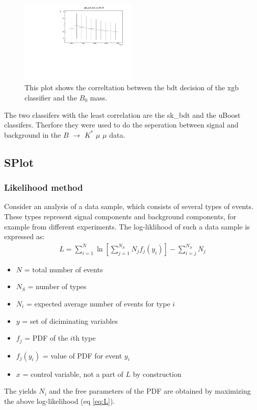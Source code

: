 \documentclass[english]{uzhpub}
\begin{document}
\begin{figure}[H]
  \centering
  \includegraphics[width=0.5\textwidth]{plots/xgb_plot_bdt_vs_B0_M}
  \caption{This plot shows the correltation between the bdt decision of the xgb classifier and the $B_0$ mass.}
  \label{fig:xgbB0M}
\end{figure}

The two classifers with the least correlation are the sk\_bdt and the uBoost classifers. Therfore they were used to do the seperation between signal and background in the $B$ $\rightarrow$ $K^{*}$ $\mu$ $\mu$ data.

\subsection{SPlot}

\subsubsection{Likelihood method}
Consider an analysis of a data sample, which consists of several types of events. These types represent signal components and background components, for example from different experiments. The log-liklihood of such a data sample is expressed as:
\begin{align}
  L = \sum_{i=1}^{N} \ln \left[ \sum_{j=1}^{N_S} N_j f_j (y_i) \right] - \sum_{i=j}^{N_S} N_j \label{eq:L}
\end{align}

\begin{itemize}
  \item $N$ = total number of events \\
  \item $N_S$ = number of types \\
  \item $N_i$ = expected average number of events for type $i$ \\
  \item $y$ = set of diciminating variables \\
  \item $f_j$ = PDF of the $i$th type \\
  \item $f_j(y_i)$ = value of PDF for event $y_i$ \\
  \item $x$ = control variable, not a part of $L$ by construction
\end{itemize}
The yields $N_i$ and the free parameters of the PDF are obtained by maximizing the above log-likelihood (eq \ref{eq:L}).
\end{document}
